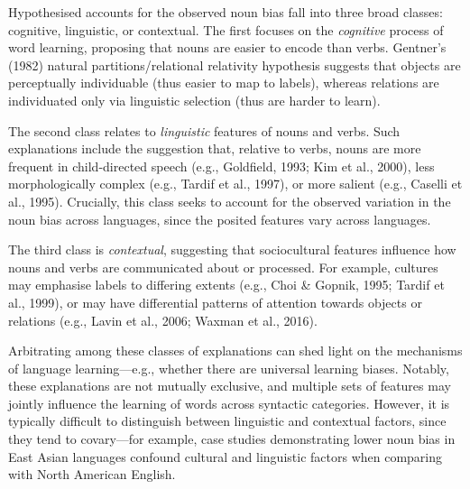 \documentclass[10pt, letterpaper]{article}
\begin{document}
Hypothesised accounts for the observed noun bias fall into three broad
classes: cognitive, linguistic, or contextual. The first focuses on the
\emph{cognitive} process of word learning, proposing that nouns are
easier to encode than verbs. Gentner's (1982) natural
partitions/relational relativity hypothesis suggests that objects are
perceptually individuable (thus easier to map to labels), whereas
relations are individuated only via linguistic selection (thus are
harder to learn).

The second class relates to \emph{linguistic} features of nouns and
verbs. Such explanations include the suggestion that, relative to verbs,
nouns are more frequent in child-directed speech (e.g., Goldfield, 1993;
Kim et al., 2000), less morphologically complex (e.g., Tardif et al.,
1997), or more salient (e.g., Caselli et al., 1995). Crucially, this
class seeks to account for the observed variation in the noun bias
across languages, since the posited features vary across languages.

The third class is \emph{contextual}, suggesting that sociocultural
features influence how nouns and verbs are communicated about or
processed. For example, cultures may emphasise labels to differing
extents (e.g., Choi \& Gopnik, 1995; Tardif et al., 1999), or may have
differential patterns of attention towards objects or relations (e.g.,
Lavin et al., 2006; Waxman et al., 2016).

Arbitrating among these classes of explanations can shed light on the
mechanisms of language learning---e.g., whether there are universal
learning biases. Notably, these explanations are not mutually exclusive,
and multiple sets of features may jointly influence the learning of
words across syntactic categories. However, it is typically difficult to
distinguish between linguistic and contextual factors, since they tend
to covary---for example, case studies demonstrating lower noun bias in
East Asian languages confound cultural and linguistic factors when
comparing with North American English.
\end{document}
